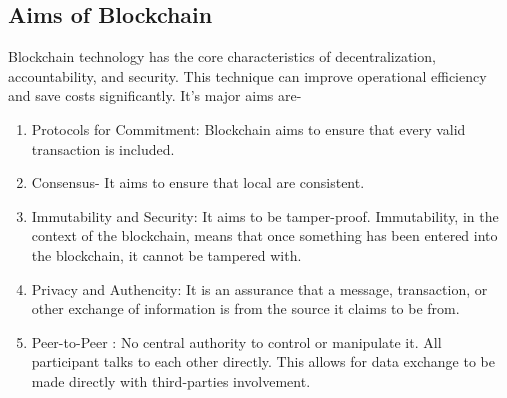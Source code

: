 \documentclass{report}
\begin{document}
\subsection{Aims of Blockchain}
Blockchain technology has the core characteristics of decentralization, accountability, and security. This technique can improve operational efficiency and save costs significantly. It's major aims are-
\begin{enumerate}
     

    \item Protocols for Commitment: Blockchain aims to ensure that every valid transaction is included.
    \item Consensus- It aims to ensure that local are consistent.
    \item Immutability and Security: It aims to be tamper-proof. Immutability, in the context of the blockchain, means that once something has been entered into the blockchain, it cannot be tampered with.
    \item Privacy and Authencity:  It is an assurance that a message, transaction, or other exchange of information is from the source it claims to be from.
    \item Peer-to-Peer : No central authority to control or manipulate it. All participant talks to each other directly. This allows for data exchange to be made directly with third-parties involvement.
\end{enumerate}
\end{document}
